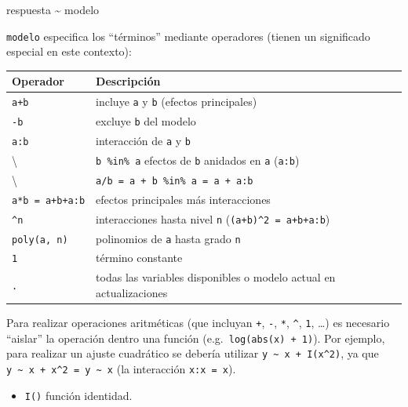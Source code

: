 \documentclass[
]{book}
\newenvironment{Shaded}{\begin{snugshade}}{\end{snugshade}}
\newcommand{\NormalTok}[1]{#1}
\newcommand{\SpecialCharTok}[1]{\textcolor[rgb]{0.00,0.00,0.00}{#1}}
\providecommand{\tightlist}{%
  \setlength{\itemsep}{0pt}\setlength{\parskip}{0pt}}
\theoremstyle{break}
\theoremstyle{nonumberplain}
\begin{document}
\begin{Shaded}
\begin{Highlighting}[]
\NormalTok{respuesta }\SpecialCharTok{\textasciitilde{}}\NormalTok{ modelo}
\end{Highlighting}
\end{Shaded}

\texttt{modelo} especifica los ``términos'' mediante operadores (tienen un significado especial en este contexto):

\begin{longtable}[]{@{}ll@{}}
\toprule
Operador & Descripción \\
\midrule
\endhead
\texttt{a+b} & incluye \texttt{a} y \texttt{b} (efectos principales) \\
\texttt{-b} & excluye \texttt{b} del modelo \\
\texttt{a:b} & interacción de \texttt{a} y \texttt{b} \\
\textbackslash{} & \texttt{b\ \%in\%\ a} efectos de \texttt{b} anidados en \texttt{a} (\texttt{a:b}) \\
\textbackslash{} & \texttt{a/b\ =\ a\ +\ b\ \%in\%\ a\ =\ a\ +\ a:b} \\
\texttt{a*b\ =\ a+b+a:b} & efectos principales más interacciones \\
\texttt{\^{}n} & interacciones hasta nivel \texttt{n} (\texttt{(a+b)\^{}2\ =\ a+b+a:b}) \\
\texttt{poly(a,\ n)} & polinomios de \texttt{a} hasta grado \texttt{n} \\
\texttt{1} & término constante \\
\texttt{.} & todas las variables disponibles o modelo actual en actualizaciones \\
\bottomrule
\end{longtable}

Para realizar operaciones aritméticas (que incluyan \texttt{+}, \texttt{-}, \texttt{*}, \texttt{\^{}}, \texttt{1}, \ldots)
es necesario ``aislar'' la operación
dentro una función (e.g.~\texttt{log(abs(x)\ +\ 1)}).
Por ejemplo, para realizar un ajuste cuadrático se debería utilizar \texttt{y\ \textasciitilde{}\ x\ +\ I(x\^{}2)}, ya que \texttt{y\ \textasciitilde{}\ x\ +\ x\^{}2\ =\ y\ \textasciitilde{}\ x} (la interacción \texttt{x:x\ =\ x}).

\begin{itemize}
\tightlist
\item
  \texttt{I()} función identidad.
\end{itemize}
\end{document}

